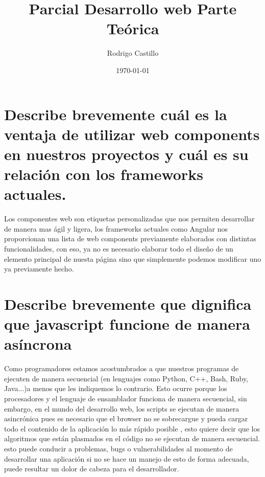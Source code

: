 \documentclass[10pt,a4paper]{article} %
\begin{document}
    \title{{  Parcial Desarrollo web Parte Teórica  }}
    \author{{Rodrigo Castillo}}
    \date{\today}

    \maketitle


    \section{Describe brevemente cuál es la ventaja de utilizar web components
    en nuestros proyectos y cuál es su relación con los frameworks actuales.}

        Los componentes web son etiquetas personalizadas que nos permiten
        desarrollar de manera mas ágil y ligera, los frameworks actuales como
        Angular nos proporcionan una lista de web components previamente
        elaborados con distintas funcionalidades, con eso, ya no es necesario
        elaborar todo el diseño de un elemento principal de nuesta página sino
        que simplemente podemos modificar uno ya previamente hecho.

    \section{Describe brevemente que dignifica que javascript funcione de manera asíncrona}

        Como programadores estamos acostumbrados a que nuestros programas de
        ejecuten de manera secuencial (en lenguajes como Python, C++, Bash,
        Ruby, Java...)a menos que les indiquemos lo contrario. Esto ocurre
        porque los procesadores y el lenguaje de ensamblador funciona de manera
        secuencial,
        sin embargo, en el mundo del desarrollo web, los scripts se ejecutan de
        manera asincrónica pues es necesario que el browser no se sobrecargue y
        pueda cargar todo el contenido de la aplicación lo más rápido posible ,
        esto quiere decir que los algoritmos que están
        plasmados en el código no se ejecutan de manera secuencial.  esto puede
        conducir a problemas, bugs o vulnerabilidades al momento de desarrollar
        una aplicación si no se hace un manejo de esto de forma adecuada, puede
        resultar un dolor de cabeza para el desarrollador.

















    \nocite{*}
    
    
\end{document}
